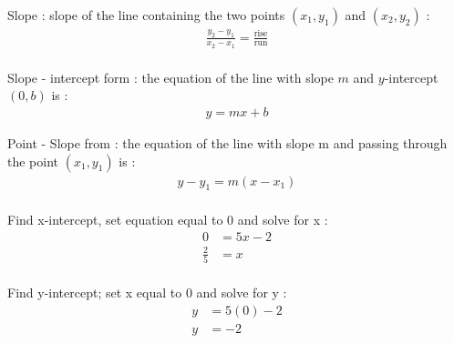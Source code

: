 \documentclass[10pt,onecolumn]{article}
\begin{document}
Slope : slope of the line containing the two points $(x_1, y_1)$ and $(x_2, y_2)$ : \\
\begin{align*}
	\frac{y_2 - y_1}{x_2 - x_1} = \frac{\text{rise}}{\text{run}} \\%
\end{align*}

Slope - intercept form : the equation of the line with slope $m$ and $y$-intercept $(0, b)$ is : \\%
\begin{align*}
y = mx + b 
\end{align*}

Point - Slope from : the equation of the line with slope m and passing through the point $(x_1, y_1)$ is : 
\begin{align*}
y - y_1 =  m(x - x_1)  \\
\end{align*}

Find x-intercept, set equation equal to 0 and solve for x : \\
\begin{align*}
0 & = 5x - 2 \\
\frac{2}{5} & = x \\
\end{align*}

Find y-intercept; set x equal to 0 and solve for y : \\
\begin{align*}
y & = 5(0) - 2 \\
y & = -2 \\
\end{align*}

\end{document}

